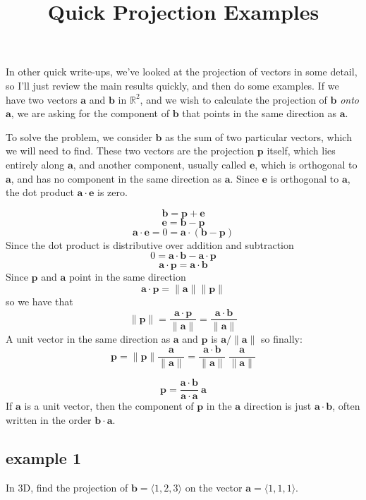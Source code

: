 \documentclass[11pt, oneside]{article}   	%
\title{Quick Projection Examples}
\date{}							%
\begin{document}
\maketitle
\Large
\noindent
In other quick write-ups, we've looked at the projection of vectors in some detail, so I'll just review the main results quickly, and then do some examples.  If we have two vectors $\mathbf{a}$ and $\mathbf{b}$ in $\mathbb{R}^2$, and we wish to calculate the projection of $\mathbf{b}$ \emph{onto} $\mathbf{a}$, we are asking for the component of $\mathbf{b}$ that points in the same direction as $\mathbf{a}$.

To solve the problem, we consider $\mathbf{b}$ as the sum of two particular vectors, which we will need to find.  These two vectors are the projection $\mathbf{p}$ itself, which lies entirely along $\mathbf{a}$, and another component, usually called $\mathbf{e}$, which is orthogonal to $\mathbf{a}$, and has no component in the same direction as $\mathbf{a}$.  Since $\mathbf{e}$ is orthogonal to $\mathbf{a}$, the dot product $\mathbf{a} \cdot \mathbf{e}$ is zero.

\[ \mathbf{b} = \mathbf{p} + \mathbf{e} \]
\[ \mathbf{e} = \mathbf{b} - \mathbf{p} \]
\[ \mathbf{a} \cdot \mathbf{e} = 0 = \mathbf{a} \cdot (\mathbf{b} - \mathbf{p}) \]
Since the dot product is distributive over addition and subtraction
\[ 0 = \mathbf{a} \cdot \mathbf{b} - \mathbf{a} \cdot \mathbf{p} \]
\[ \mathbf{a} \cdot \mathbf{p}  = \mathbf{a} \cdot \mathbf{b} \]
Since $\mathbf{p}$ and $\mathbf{a}$ point in the same direction
\[ \mathbf{a} \cdot \mathbf{p}  = \| \mathbf{a} \|  \| \mathbf{p} \| \]
so we have that
\[ \| \mathbf{p} \| = \frac{\mathbf{a} \cdot \mathbf{p}}{\| \mathbf{a} \|} =  \frac{\mathbf{a} \cdot \mathbf{b}}{\| \mathbf{a} \|} \]
A unit vector in the same direction as $\mathbf{a}$ and $\mathbf{p}$ is $\mathbf{a}/\|\mathbf{a}\|$ so finally:
\[ \mathbf{p} = \| \mathbf{p} \| \frac{\mathbf{a}}{\|\mathbf{a}\|} =  \frac{\mathbf{a} \cdot \mathbf{b}}{\| \mathbf{a} \|} \ \frac{\mathbf{a}}{\| \mathbf{a} \|} \]

\[ \mathbf{p} =  \frac{\mathbf{a} \cdot \mathbf{b}}{\mathbf{a} \cdot \mathbf{a} } \ \mathbf{a} \]
If $\mathbf{a}$ is a unit vector, then the component of $\mathbf{p}$ in the $\mathbf{a}$ direction is just $\mathbf{a} \cdot \mathbf{b}$, often written in the order $\mathbf{b} \cdot \mathbf{a}$.
\subsection*{example 1}
In 3D, find the projection of $\mathbf{b} = \langle 1, 2, 3 \rangle$ on the vector $\mathbf{a} = \langle 1, 1, 1 \rangle$.
\end{document}
